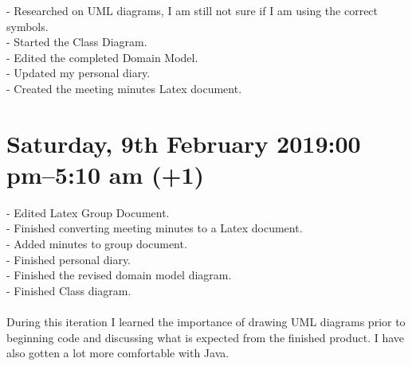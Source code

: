 \documentclass[12pt]{article}
\begin{document}
-	Researched on UML diagrams, I am still not sure if I am using the correct symbols.\\ 
-	Started the Class Diagram.\\
-	Edited the completed Domain Model. \\
-	Updated my personal diary. \\
-	Created the meeting minutes Latex document. \\

\section{Saturday, 9th February 2019:00 pm–5:10 am (+1)  }


-	Edited Latex Group Document. \\
-	Finished converting meeting minutes to a Latex document. \\
-	Added minutes to group document. \\
-	Finished personal diary. \\
-	Finished the revised domain model diagram.\\
-	Finished Class diagram. \\ \\
During this iteration I learned the importance of drawing UML diagrams prior to beginning code and discussing what is expected from the finished product. I have also gotten a lot more comfortable with Java. \\
\end{document}
